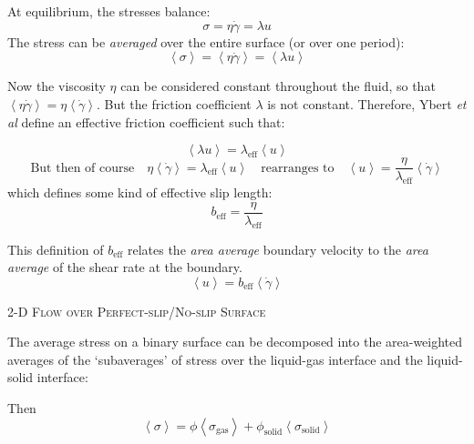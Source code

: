 \documentclass[12pt, a4paper, twoside, openright]{book}
\newcommand{\beff}{\ensuremath{b_{\mathrm{eff}}}}
\newcommand{\phisol}{\ensuremath{\phi_{\mathrm{solid}}}}
\newcommand{\sigsol}{\ensuremath{\sigma_{\mathrm{solid}}}}
\begin{document}
At equilibrium, the stresses balance:
\begin{equation}
\sigma = \eta \dot{\gamma} = \lambda u
\end{equation}
The stress can be \emph{averaged} over the entire surface (or over one period):
\begin{equation}
\left< \sigma \right> = \left< \eta \dot{\gamma} \right> = \left< \lambda u \right>
\end{equation}

Now the viscosity $\eta$ can be considered constant throughout the fluid, so that $  \left< \eta \dot{\gamma} \right> = \eta \left< \dot{\gamma} \right> $.  But the friction coefficient $\lambda$ is not constant.  Therefore, Ybert \emph{et al} define an effective friction coefficient such that:

\begin{equation}
\left< \lambda u \right> = \lambda_{\mathrm{eff}} \left< u \right>
\end{equation}
\begin{equation}
\text{But then of course} \quad
\eta \left< \dot{\gamma} \right> = \lambda_{\mathrm{eff}} \left< u \right>
\quad \text{rearranges to}  \quad
\left< u \right> = \frac{\eta}{ \lambda_{\mathrm{eff}} } \left< \dot{\gamma} \right> 
\end{equation}
which defines some kind of effective slip length:
\begin{equation}
\beff = \frac{\eta}{ \lambda_{\mathrm{eff}} }  
\end{equation}

This definition of $\beff$ relates the \emph{area average} boundary velocity to the \emph{area average} of the shear rate at the boundary.
\begin{equation}
\left< u \right> = \beff \left< \dot{\gamma} \right> 
\end{equation}

\vspace*{1em}
\colorbox[gray]{0.8}{ \textsc{2-D Flow over Perfect-slip/No-slip Surface} }
\vspace{0.5em}

The average stress on a binary surface can be decomposed into the area-weighted averages of the `subaverages' of stress over the liquid-gas interface and the liquid-solid interface:

Then 
\begin{equation}
\left< \sigma \right> = \phi \left< \sigma_{\mathrm{gas}} \right> + 
\phisol \left<  \sigsol \right> 
\end{equation}
\end{document}
